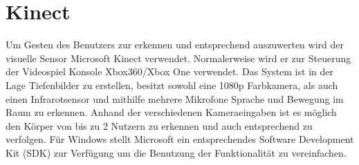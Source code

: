 \section{Kinect}
Um Gesten des Benutzers zur erkennen und entsprechend auszuwerten wird der visuelle Sensor Microsoft Kinect verwendet. Normalerweise wird er zur Steuerung der Videospiel Konsole Xbox360/Xbox One verwendet. Das System ist in der Lage Tiefenbilder zu erstellen, besitzt sowohl eine 1080p Farbkamera, als auch einen Infrarotsensor und mithilfe mehrere Mikrofone Sprache und Bewegung im Raum zu erkennen. Anhand der verschiedenen Kameraeingaben ist es möglich den Körper von bis zu 2 Nutzern zu erkennen und auch entsprechend zu verfolgen. Für Windows stellt Microsoft ein entsprechendes Software Development Kit (SDK) zur Verfügung um die Benutzung der Funktionalität zu vereinfachen.
